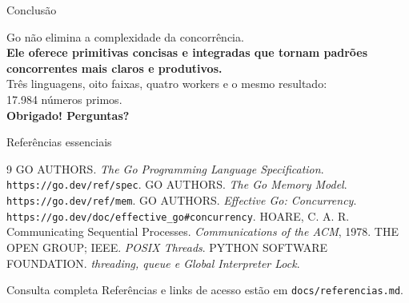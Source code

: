 \documentclass[aspectratio=169,11pt]{beamer}
\begin{document}
\begin{frame}{Conclusão}
  \begin{center}
    \Large
    Go não elimina a complexidade da concorrência.\\[0.7em]
    \color{GoDark}\textbf{Ele oferece primitivas concisas e integradas que tornam padrões concorrentes mais claros e produtivos.}\\[1em]
    \normalsize\color{black}
    Três linguagens, oito faixas, quatro workers e o mesmo resultado:\\
    \alert{17.984 números primos}.\\[1.2em]
    \textbf{Obrigado! Perguntas?}
  \end{center}
\end{frame}

\begin{frame}{Referências essenciais}
  \footnotesize
  \begin{thebibliography}{9}
     GO AUTHORS. \emph{The Go Programming Language Specification}. \texttt{https://go.dev/ref/spec}.
     GO AUTHORS. \emph{The Go Memory Model}. \texttt{https://go.dev/ref/mem}.
     GO AUTHORS. \emph{Effective Go: Concurrency}. \texttt{https://go.dev/doc/effective\_go\#concurrency}.
     HOARE, C. A. R. Communicating Sequential Processes. \emph{Communications of the ACM}, 1978.
     THE OPEN GROUP; IEEE. \emph{POSIX Threads}.
     PYTHON SOFTWARE FOUNDATION. \emph{threading, queue e Global Interpreter Lock}.
  \end{thebibliography}
  \begin{block}{Consulta completa}
    Referências e links de acesso estão em \texttt{docs/referencias.md}.
  \end{block}
\end{frame}
\end{document}
